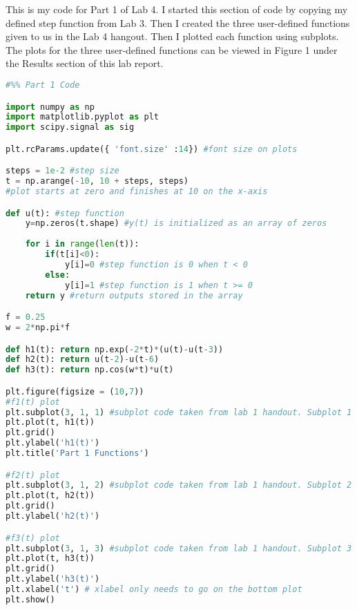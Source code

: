 \documentclass[12pt]{report}
\begin{document}
This is my code for Part 1 of Lab 4. I started this section of code by copying my defined step function from Lab 3. Then I created the three user-defined functions given to us in the Lab 4 hangout. Then I plotted each function using subplots. The plots for the three user-defined functions can be viewed in Figure 1 under the Results section of this lab report.  
\begin{lstlisting}[language=Python]
#%% Part 1 Code

import numpy as np
import matplotlib.pyplot as plt
import scipy.signal as sig

plt.rcParams.update({ 'font.size' :14}) #font size on plots

steps = 1e-2 #step size
t = np.arange(-10, 10 + steps, steps) 
#plot starts at zero and finishes at 10 on the x-axis

def u(t): #step function
    y=np.zeros(t.shape) #y(t) is initialized as an array of zeros
    
    for i in range(len(t)):
        if(t[i]<0):
            y[i]=0 #step function is 0 when t < 0
        else:
            y[i]=1 #step function is 1 when t >= 0
    return y #return outputs stored in the array

f = 0.25
w = 2*np.pi*f

def h1(t): return np.exp(-2*t)*(u(t)-u(t-3))
def h2(t): return u(t-2)-u(t-6)
def h3(t): return np.cos(w*t)*u(t)

plt.figure(figsize = (10,7))
#f1(t) plot
plt.subplot(3, 1, 1) #subplot code taken from lab 1 handout. Subplot 1
plt.plot(t, h1(t))
plt.grid()
plt.ylabel('h1(t)')
plt.title('Part 1 Functions')

#f2(t) plot
plt.subplot(3, 1, 2) #subplot code taken from lab 1 handout. Subplot 2
plt.plot(t, h2(t))
plt.grid()
plt.ylabel('h2(t)')

#f3(t) plot
plt.subplot(3, 1, 3) #subplot code taken from lab 1 handout. Subplot 3
plt.plot(t, h3(t))
plt.grid()
plt.ylabel('h3(t)')
plt.xlabel('t') # xlabel only needs to go on the bottom plot
plt.show()
\end{lstlisting}
\end{document}
